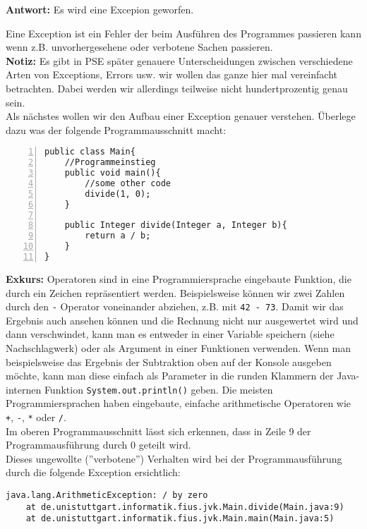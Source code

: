 \textbf{Antwort:} Es wird  eine Excepion geworfen.\\
\begin{Infobox}[Exception]
    Eine Exception ist ein Fehler der beim Ausführen des Programmes passieren kann wenn z.B. unvorhergesehene oder verbotene Sachen passieren.\\


    \textbf{Notiz:} Es gibt in PSE später genauere Unterscheidungen zwischen verschiedene Arten von Exceptions, Errors usw. wir wollen das ganze hier mal vereinfacht betrachten. Dabei werden wir allerdings teilweise nicht hundertprozentig genau sein.\\

    Als nächstes wollen wir den Aufbau einer Exception genauer verstehen.
    Überlege dazu was der folgende Programmausschnitt macht:

    \begin{lstlisting}[numbers=left,xleftmargin=2em,frame=single,framexleftmargin=1.5em]
public class Main{
    //Programmeinstieg
    public void main(){
        //some other code
        divide(1, 0);
    }
    
    public Integer divide(Integer a, Integer b){
        return a / b;
    }
}
    \end{lstlisting}
    \textbf{Exkurs:} Operatoren sind in eine Programmiersprache eingebaute Funktion, die durch ein Zeichen repräsentiert werden.
    Beispielsweise können wir zwei Zahlen durch den \texttt{-} Operator voneinander abziehen, z.B. mit \texttt{42 - 73}.
    Damit wir das Ergebnis auch ansehen können und die Rechnung nicht nur ausgewertet wird und dann verschwindet, kann man es entweder in einer Variable speichern (siehe Nachschlagwerk) oder als Argument in einer Funktionen verwenden.
    Wenn man beispielsweise das Ergebnis der Subtraktion oben auf der Konsole ausgeben möchte, kann man diese einfach als Parameter in die runden Klammern der Java-internen Funktion \lstinline{System.out.println()} geben.
    Die meisten Programmiersprachen haben eingebaute, einfache arithmetische Operatoren wie \texttt{+}, \texttt{-}, \texttt{*} oder \texttt{/}.\\

    Im oberen Programmausschnitt lässt sich erkennen, dass in Zeile 9 der Programmausführung durch 0 geteilt wird.\\
    Dieses ungewollte (''verbotene'') Verhalten wird bei der Programmausführung durch die folgende Exception ersichtlich:

    \begin{lstlisting}[keywords={}, breaklines=true, numbers=none]
java.lang.ArithmeticException: / by zero
    at de.unistuttgart.informatik.fius.jvk.Main.divide(Main.java:9)
    at de.unistuttgart.informatik.fius.jvk.Main.main(Main.java:5)
    \end{lstlisting}    


\end{Infobox}
